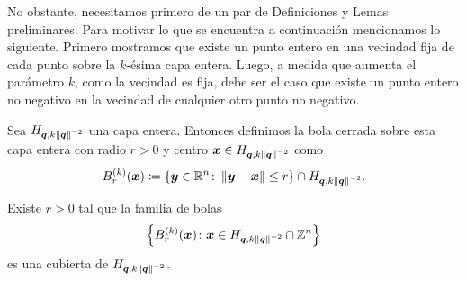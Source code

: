 No obstante, necesitamos primero de un par de Definiciones y Lemas preliminares. Para motivar lo que
se encuentra a continuación mencionamos lo siguiente. Primero mostramos que existe un punto entero
en una vecindad fija de cada punto sobre la $k$-ésima capa entera. Luego, a medida que aumenta el
parámetro $k$, como la vecindad es fija, debe ser el caso que existe un punto entero no negativo en
la vecindad de cualquier otro punto no negativo.

Sea $H_{\boldsymbol{q}, k\left\lVert \boldsymbol{q} \right\rVert^{-2}}$ una capa entera. Entonces definimos la bola cerrada sobre
esta capa entera con radio $r > 0$ y centro $\boldsymbol{x} \in H_{\boldsymbol{q}, k\left\lVert \boldsymbol{q} \right\rVert^{-2}}$ como
\begin{equation}
	\label{eq:k-ball}
	B_r^{(k)}(\boldsymbol{x}) \coloneq \lbrace \boldsymbol{y} \in \mathbb{R}^n \colon \left\lVert \boldsymbol{y} - \boldsymbol{x} \right\rVert \leq r
	\rbrace \cap H_{\boldsymbol{q}, k \left\lVert \boldsymbol{q} \right\rVert^{-2}}.
\end{equation}
\begin{lemma}
	\label{lemma:ball-cover}
	Existe $r > 0$ tal que la familia de bolas
	\begin{equation*}
		\left\lbrace B_r^{(k)}(\boldsymbol{x}) \colon \boldsymbol{x} \in H_{\boldsymbol{q}, k\left\lVert \boldsymbol{q} \right\rVert^{-2}} \cap
			\mathbb{Z}^n \right\rbrace
	\end{equation*}
	es una cubierta de $H_{\boldsymbol{q}, k\left\lVert \boldsymbol{q} \right\rVert^{-2}}$.
\end{lemma}
